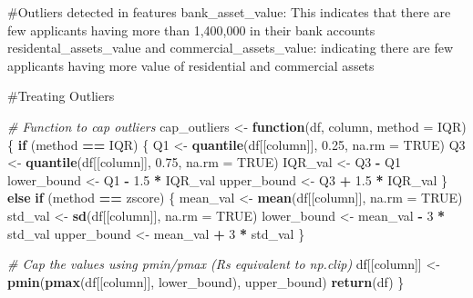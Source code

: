 \documentclass[
]{article}
\newenvironment{Shaded}{\begin{snugshade}}{\end{snugshade}}
\newcommand{\AttributeTok}[1]{\textcolor[rgb]{0.13,0.29,0.53}{#1}}
\newcommand{\CommentTok}[1]{\textcolor[rgb]{0.56,0.35,0.01}{\textit{#1}}}
\newcommand{\ConstantTok}[1]{\textcolor[rgb]{0.56,0.35,0.01}{#1}}
\newcommand{\ControlFlowTok}[1]{\textcolor[rgb]{0.13,0.29,0.53}{\textbf{#1}}}
\newcommand{\DecValTok}[1]{\textcolor[rgb]{0.00,0.00,0.81}{#1}}
\newcommand{\FloatTok}[1]{\textcolor[rgb]{0.00,0.00,0.81}{#1}}
\newcommand{\FunctionTok}[1]{\textcolor[rgb]{0.13,0.29,0.53}{\textbf{#1}}}
\newcommand{\NormalTok}[1]{#1}
\newcommand{\OtherTok}[1]{\textcolor[rgb]{0.56,0.35,0.01}{#1}}
\newcommand{\SpecialCharTok}[1]{\textcolor[rgb]{0.81,0.36,0.00}{\textbf{#1}}}
\newcommand{\StringTok}[1]{\textcolor[rgb]{0.31,0.60,0.02}{#1}}
\begin{document}
\#Outliers detected in features bank\_asset\_value: This indicates that
there are few applicants having more than 1,400,000 in their bank
accounts residental\_assets\_value and commercial\_assets\_value:
indicating there are few applicants having more value of residential and
commercial assets

\#Treating Outliers

\begin{Shaded}
\begin{Highlighting}[]
\CommentTok{\# Function to cap outliers}
\NormalTok{cap\_outliers }\OtherTok{\textless{}{-}} \ControlFlowTok{function}\NormalTok{(df, column, }\AttributeTok{method =} \StringTok{\textquotesingle{}IQR\textquotesingle{}}\NormalTok{) \{}
  \ControlFlowTok{if}\NormalTok{ (method }\SpecialCharTok{==} \StringTok{\textquotesingle{}IQR\textquotesingle{}}\NormalTok{) \{}
\NormalTok{    Q1 }\OtherTok{\textless{}{-}} \FunctionTok{quantile}\NormalTok{(df[[column]], }\FloatTok{0.25}\NormalTok{, }\AttributeTok{na.rm =} \ConstantTok{TRUE}\NormalTok{)}
\NormalTok{    Q3 }\OtherTok{\textless{}{-}} \FunctionTok{quantile}\NormalTok{(df[[column]], }\FloatTok{0.75}\NormalTok{, }\AttributeTok{na.rm =} \ConstantTok{TRUE}\NormalTok{)}
\NormalTok{    IQR\_val }\OtherTok{\textless{}{-}}\NormalTok{ Q3 }\SpecialCharTok{{-}}\NormalTok{ Q1}
\NormalTok{    lower\_bound }\OtherTok{\textless{}{-}}\NormalTok{ Q1 }\SpecialCharTok{{-}} \FloatTok{1.5} \SpecialCharTok{*}\NormalTok{ IQR\_val}
\NormalTok{    upper\_bound }\OtherTok{\textless{}{-}}\NormalTok{ Q3 }\SpecialCharTok{+} \FloatTok{1.5} \SpecialCharTok{*}\NormalTok{ IQR\_val}
\NormalTok{  \} }\ControlFlowTok{else} \ControlFlowTok{if}\NormalTok{ (method }\SpecialCharTok{==} \StringTok{\textquotesingle{}zscore\textquotesingle{}}\NormalTok{) \{}
\NormalTok{    mean\_val }\OtherTok{\textless{}{-}} \FunctionTok{mean}\NormalTok{(df[[column]], }\AttributeTok{na.rm =} \ConstantTok{TRUE}\NormalTok{)}
\NormalTok{    std\_val }\OtherTok{\textless{}{-}} \FunctionTok{sd}\NormalTok{(df[[column]], }\AttributeTok{na.rm =} \ConstantTok{TRUE}\NormalTok{)}
\NormalTok{    lower\_bound }\OtherTok{\textless{}{-}}\NormalTok{ mean\_val }\SpecialCharTok{{-}} \DecValTok{3} \SpecialCharTok{*}\NormalTok{ std\_val}
\NormalTok{    upper\_bound }\OtherTok{\textless{}{-}}\NormalTok{ mean\_val }\SpecialCharTok{+} \DecValTok{3} \SpecialCharTok{*}\NormalTok{ std\_val}
\NormalTok{  \}}
  
  \CommentTok{\# Cap the values using pmin/pmax (R\textquotesingle{}s equivalent to np.clip)}
\NormalTok{  df[[column]] }\OtherTok{\textless{}{-}} \FunctionTok{pmin}\NormalTok{(}\FunctionTok{pmax}\NormalTok{(df[[column]], lower\_bound), upper\_bound)}
  \FunctionTok{return}\NormalTok{(df)}
\NormalTok{\}}


\end{Highlighting}
\end{Shaded}
\end{document}
